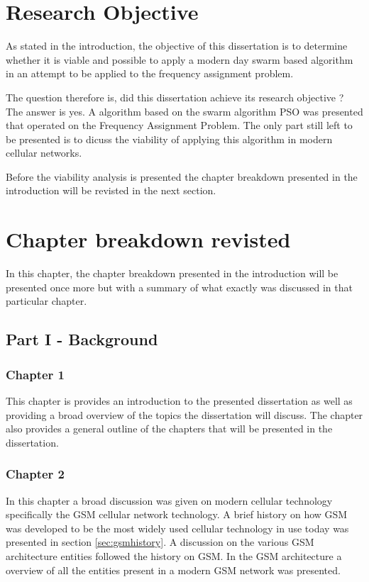 \section{Research Objective}
As stated in the introduction, the objective of this dissertation is to determine whether it is viable and possible to apply a modern day swarm based algorithm in an attempt to be applied to the frequency assignment problem. 

The question therefore is, did this dissertation achieve its research objective ? The answer is yes. A algorithm based on the swarm algorithm PSO was presented that operated on the Frequency Assignment Problem. The only part still left to be presented is to dicuss the viability of applying this algorithm in modern cellular networks.

Before the viability analysis is presented the chapter breakdown presented in the introduction will be revisted in the next section.

\section{Chapter breakdown revisted}
In this chapter, the chapter breakdown presented in the introduction will be presented once more but with a summary of what exactly was discussed in that particular chapter.
\subsection{Part I - Background}
\subsubsection{Chapter 1}
This chapter is provides an introduction to the presented dissertation as well as providing a broad overview of the topics the dissertation will discuss. The chapter also provides a general outline of the chapters that will be presented in the dissertation.
\subsubsection{Chapter 2}
In this chapter a broad discussion was given on modern cellular technology specifically the GSM cellular network technology. A brief history on how GSM was developed to be the most widely used cellular technology in use today was presented in section \ref{sec:gsmhistory}. A discussion on the various GSM architecture entities followed the history on GSM. In the GSM architecture a overview of all the entities present in a modern GSM network was presented.

